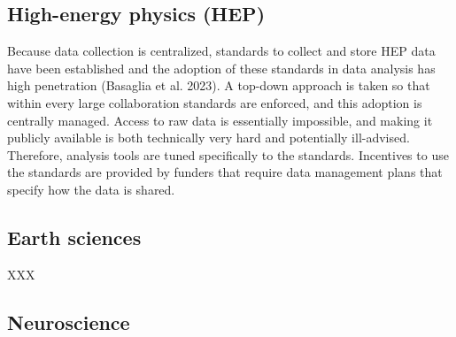 \documentclass[
  letterpaper,
  DIV=11,
  numbers=noendperiod]{scrartcl}
\begin{document}
\subsection{High-energy physics (HEP)}\label{high-energy-physics-hep}

Because data collection is centralized, standards to collect and store
HEP data have been established and the adoption of these standards in
data analysis has high penetration (Basaglia et al. 2023). A top-down
approach is taken so that within every large collaboration standards are
enforced, and this adoption is centrally managed. Access to raw data is
essentially impossible, and making it publicly available is both
technically very hard and potentially ill-advised. Therefore, analysis
tools are tuned specifically to the standards. Incentives to use the
standards are provided by funders that require data management plans
that specify how the data is shared.

\subsection{Earth sciences}\label{earth-sciences}

XXX

\subsection{Neuroscience}\label{neuroscience}
\end{document}
